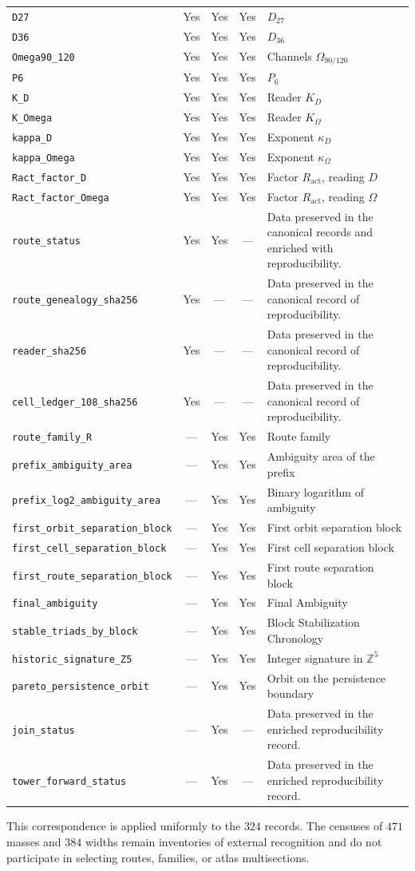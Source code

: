 \begin{longtable}{p{}ccc p{}}
\nolinkurl{D27} & Yes & Yes & Yes & \(D_{27}\) \\
\nolinkurl{D36} & Yes & Yes & Yes & \(D_{36}\) \\
\nolinkurl{Omega90_120} & Yes & Yes & Yes & Channels \(\Omega_{90/120}\) \\
\nolinkurl{P6} & Yes & Yes & Yes & \(P_6\) \\
\nolinkurl{K_D} & Yes & Yes & Yes & Reader \(K_D\) \\
\nolinkurl{K_Omega} & Yes & Yes & Yes & Reader \(K_\Omega\) \\
\nolinkurl{kappa_D} & Yes & Yes & Yes & Exponent \(\kappa_D\) \\
\nolinkurl{kappa_Omega} & Yes & Yes & Yes & Exponent \(\kappa_\Omega\) \\
\nolinkurl{Ract_factor_D} & Yes & Yes & Yes & Factor \(R_{\mathrm{act}}\), reading \(D\) \\
\nolinkurl{Ract_factor_Omega} & Yes & Yes & Yes & Factor \(R_{\mathrm{act}}\), reading \(\Omega\) \\
\nolinkurl{route_status} & Yes & Yes & --- & Data preserved in the canonical records and enriched with reproducibility. \\
\nolinkurl{route_genealogy_sha256} & Yes & --- & --- & Data preserved in the canonical record of reproducibility. \\
\nolinkurl{reader_sha256} & Yes & --- & --- & Data preserved in the canonical record of reproducibility. \\
\nolinkurl{cell_ledger_108_sha256} & Yes & --- & --- & Data preserved in the canonical record of reproducibility. \\
\nolinkurl{route_family_R} & --- & Yes & Yes & Route family \\
\nolinkurl{prefix_ambiguity_area} & --- & Yes & Yes & Ambiguity area of the prefix \\
\nolinkurl{prefix_log2_ambiguity_area} & --- & Yes & Yes & Binary logarithm of ambiguity \\
\nolinkurl{first_orbit_separation_block} & --- & Yes & Yes & First orbit separation block \\
\nolinkurl{first_cell_separation_block} & --- & Yes & Yes & First cell separation block \\
\nolinkurl{first_route_separation_block} & --- & Yes & Yes & First route separation block \\
\nolinkurl{final_ambiguity} & --- & Yes & Yes & Final Ambiguity \\
\nolinkurl{stable_triads_by_block} & --- & Yes & Yes & Block Stabilization Chronology \\
\nolinkurl{historic_signature_Z5} & --- & Yes & Yes & Integer signature in \(\mathbb Z^5\) \\
\nolinkurl{pareto_persistence_orbit} & --- & Yes & Yes & Orbit on the persistence boundary \\
\nolinkurl{join_status} & --- & Yes & --- & Data preserved in the enriched reproducibility record. \\
\nolinkurl{tower_forward_status} & --- & Yes & --- & Data preserved in the enriched reproducibility record. \\
\hline
\end{longtable}
\endgroup

This correspondence is applied uniformly to the \(324\) records. The
censuses of \(471\) masses and \(384\) widths remain inventories of
external recognition and do not participate in selecting routes, families,
or atlas multisections.
